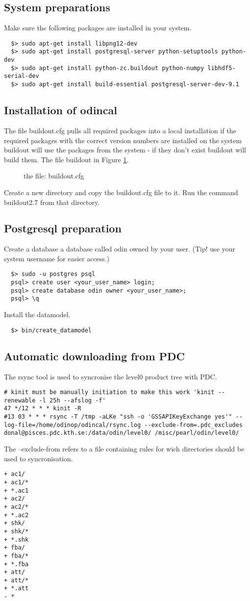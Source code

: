 \subsection{System preparations}
Make sure the following packages are installed in your system.
\begin{verbatim}  
  $> sudo apt-get install libpng12-dev
  $> sudo apt-get install postgresql-server python-setuptools python-dev
  $> sudo apt-get install python-zc.buildout python-numpy libhdf5-serial-dev
  $> sudo apt-get install build-essential postgresql-server-dev-9.1
\end{verbatim}

\subsection{Installation of odincal}

The file buildout.cfg pulls all required packages into a local installation if the required packages with the correct version numbers are installed on the system buildout will use the packages from the system - if they don't exist buildout will build them. The file buildout in Figure \ref{buildout}.

\begin{figure}
\caption{the file: buildout.cfg}
\label{buildout}
\end{figure}

Create a new directory and copy the buildout.cfg file to it. Run the command buildout2.7 from that directory.


\subsection{Postgresql preparation}
Create a database a database called odin owned by your user. (Tip! use your system username for easier access.)
 
\begin{verbatim}  
  $> sudo -u postgres psql
  psql> create user <your_user_name> login;
  psql> create database odin owner <your_user_name>;
  psql> \q
\end{verbatim}

Install the datamodel.

\begin{verbatim}  
  $> bin/create_datamodel
\end{verbatim}

\subsection{Automatic downloading from PDC}
The rsync tool is used to syncronise the level0 product tree with PDC.
\begin{verbatim}
# kinit must be manually initiation to make this work 'kinit --renewable -l 25h --afslog -f'
47 */12 * * * kinit -R
#13 03 * * * rsync -T /tmp -aLKe "ssh -o 'GSSAPIKeyExchange yes'" --log-file=/home/odinop/odincal/rsync.log --exclude-from=.pdc_excludes donal@pisces.pdc.kth.se:/data/odin/level0/ /misc/pearl/odin/level0/
\end{verbatim}

The --exclude-from refers to a file containing rules for wich directories should be used to syncronisation.

\begin{verbatim}
+ ac1/
+ ac1/*
+ *.ac1
+ ac2/
+ ac2/*
+ *.ac2
+ shk/
+ shk/*
+ *.shk
+ fba/
+ fba/*
+ *.fba
+ att/
+ att/*
+ *.att
- *
\end{verbatim}

